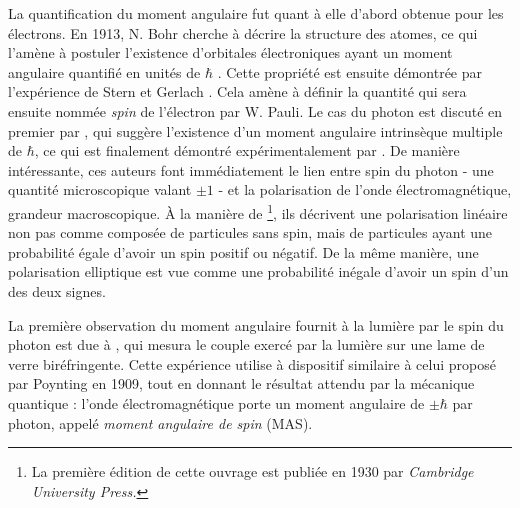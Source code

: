 La quantification du moment angulaire fut quant à elle d'abord obtenue pour les électrons. En 1913, N. Bohr cherche à décrire la structure des atomes, ce qui l'amène à postuler l'existence d'orbitales électroniques ayant un moment angulaire quantifié en unités de $\hbar$ . Cette propriété est ensuite démontrée par l'expérience de Stern et Gerlach . Cela amène  à définir la quantité qui sera ensuite nommée \textit{spin} de l'électron par W. Pauli. Le cas du photon est discuté en premier par , qui suggère l'existence d'un moment angulaire intrinsèque multiple de $\hbar$, ce qui est finalement démontré expérimentalement par . De manière intéressante, ces auteurs font immédiatement le lien entre spin du photon - une quantité microscopique valant $\pm 1$ - et la polarisation de l'onde électromagnétique, grandeur macroscopique. \`A la manière de \footnote{La première édition de cette ouvrage est publiée en 1930 par \textit{Cambridge University Press.}}, ils décrivent une polarisation linéaire non pas comme composée de particules sans spin, mais de particules ayant une probabilité égale d'avoir un spin positif ou négatif. De la même manière, une polarisation elliptique est vue comme une probabilité inégale d'avoir un spin d'un des deux signes.   

La première observation du moment angulaire fournit à la lumière par le spin du photon est due à , qui mesura le couple exercé par la lumière sur une lame de verre biréfringente. Cette expérience utilise à dispositif similaire à celui proposé par Poynting en 1909, tout en donnant le résultat attendu par la mécanique quantique : l'onde électromagnétique porte un moment angulaire de $\pm\hbar$ par photon, appelé \textit{moment angulaire de spin} (MAS).

